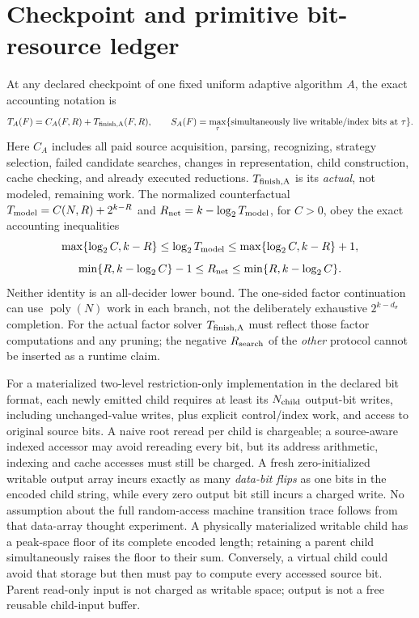\documentclass[11pt]{article}
\begin{document}
\section{Checkpoint and primitive bit-resource ledger}
At any declared checkpoint of one fixed uniform adaptive algorithm \(A\), the exact accounting notation is
\[
 T_A(F)=C_A(F,R)+T_{\rm finish,A}(F,R),\qquad
 S_A(F)=\max_{\tau}\{\text{simultaneously live writable/index bits at }\tau\}.
\]
Here \(C_A\) includes all paid source acquisition, parsing, recognizing, strategy selection, failed candidate searches, changes in representation, child construction, cache checking, and already executed reductions. \(T_{\rm finish,A}\) is its \emph{actual}, not modeled, remaining work. The normalized counterfactual \(T_{\rm model}=C(N,R)+2^{k-R}\) and \(R_{\rm net}=k-\log_2T_{\rm model}\), for \(C>0\), obey the exact accounting inequalities
\[
\max\{\log_2C,k-R\}\le\log_2 T_{\rm model}
\le\max\{\log_2C,k-R\}+1,
\]
\[
\min\{R,k-\log_2 C\}-1\le R_{\rm net}
\le\min\{R,k-\log_2C\}.
\]
Neither identity is an all-decider lower bound. The one-sided factor continuation can use \(\operatorname{poly}(N)\) work in each branch, not the deliberately exhaustive \(2^{k-d_\sigma}\) completion. For the actual factor solver \(T_{\rm finish,A}\) must reflect those factor computations and any pruning; the negative \(R_{\rm search}\) of the \emph{other} protocol cannot be inserted as a runtime claim.

For a materialized two-level restriction-only implementation in the declared bit format, each newly emitted child requires at least its \(N_{\rm child}\) output-bit writes, including unchanged-value writes, plus explicit control/index work, and access to original source bits. A naive root reread per child is chargeable; a source-aware indexed accessor may avoid rereading every bit, but its address arithmetic, indexing and cache accesses must still be charged. A fresh zero-initialized writable output array incurs exactly as many \emph{data-bit flips} as one bits in the encoded child string, while every zero output bit still incurs a charged write. No assumption about the full random-access machine transition trace follows from that data-array thought experiment. A physically materialized writable child has a peak-space floor of its complete encoded length; retaining a parent child simultaneously raises the floor to their sum. Conversely, a virtual child could avoid that storage but then must pay to compute every accessed source bit. Parent read-only input is not charged as writable space; output is not a free reusable child-input buffer.
\end{document}
